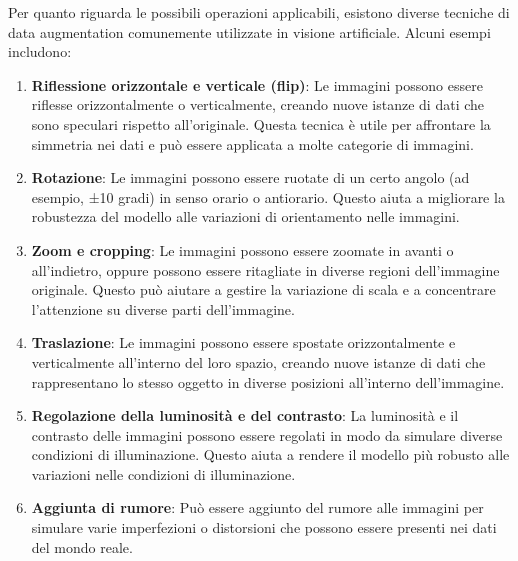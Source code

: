 \documentclass[12pt,a4paper,openright,twoside]{book}
\begin{document}
Per quanto riguarda le possibili operazioni applicabili, esistono diverse tecniche di data augmentation comunemente utilizzate in visione artificiale. Alcuni esempi includono:
\begin{enumerate}
\item \textbf{Riflessione orizzontale e verticale (flip)}: Le immagini possono essere riflesse orizzontalmente o verticalmente, creando nuove istanze di dati che sono speculari rispetto all'originale. Questa tecnica è utile per affrontare la simmetria nei dati e può essere applicata a molte categorie di immagini.

\item \textbf{Rotazione}: Le immagini possono essere ruotate di un certo angolo (ad esempio, ±10 gradi) in senso orario o antiorario. Questo aiuta a migliorare la robustezza del modello alle variazioni di orientamento nelle immagini.

\item \textbf{Zoom e cropping}: Le immagini possono essere zoomate in avanti o all'indietro, oppure possono essere ritagliate in diverse regioni dell'immagine originale. Questo può aiutare a gestire la variazione di scala e a concentrare l'attenzione su diverse parti dell'immagine.

\item \textbf{Traslazione}: Le immagini possono essere spostate orizzontalmente e verticalmente all'interno del loro spazio, creando nuove istanze di dati che rappresentano lo stesso oggetto in diverse posizioni all'interno dell'immagine.

\item \textbf{Regolazione della luminosità e del contrasto}: La luminosità e il contrasto delle immagini possono essere regolati in modo da simulare diverse condizioni di illuminazione. Questo aiuta a rendere il modello più robusto alle variazioni nelle condizioni di illuminazione.

\item \textbf{Aggiunta di rumore}: Può essere aggiunto del rumore alle immagini per simulare varie imperfezioni o distorsioni che possono essere presenti nei dati del mondo reale.
\end{enumerate}
\end{document}
